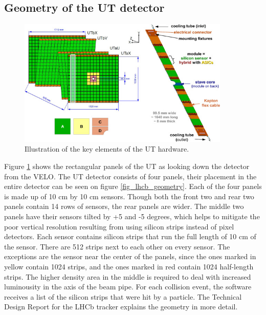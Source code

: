 \documentclass[12pt]{article}
\begin{document}
\subsection{Geometry of the UT detector}

\begin{figure}[H]
	\begin{center}
		\includegraphics[width=0.9\textwidth]{detector_ut_geometry}
	\end{center}
	\caption{Illustration of the key elements of the UT hardware. \cite{tracker_tdr}}
	\label{fig_ut_geometry}
\end{figure}

Figure \ref{fig_ut_geometry} shows the rectangular panels of the UT as looking down the detector from the VELO. The UT detector consists of four panels, their placement in the entire detector can be seen on figure \ref{fig_lhcb_geometry}. Each of the four panels is made up of 10 cm by 10 cm sensors. Though both the front two and rear two panels contain 14 rows of sensors, the rear panels are wider. The middle two panels have their sensors tilted by +5 and -5 degrees, which helps to mitigate the poor vertical resolution resulting from using silicon strips instead of pixel detectors. Each sensor contains silicon strips that run the full length of 10 cm of the sensor. There are 512 strips next to each other on every sensor. The exceptions are the sensor near the center of the panels, since the ones marked in yellow contain 1024 strips, and the ones marked in red contain 1024 half-length strips. The higher density area in the middle is required to deal with increased luminousity in the axis of the beam pipe. For each collision event, the software receives a list of the silicon strips that were hit by a particle. The Technical Design Report for the LHCb tracker\cite{tracker_tdr} explains the geometry in more detail.
\end{document}
